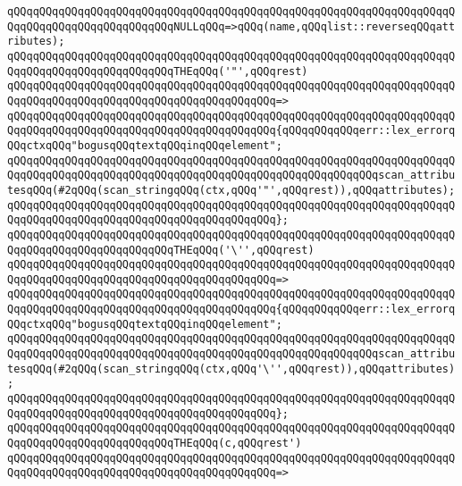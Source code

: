 \verb|qQQqqQQqqQQqqQQqqQQqqQQqqQQqqQQqqQQqqQQqqQQqqQQqqQQqqQQqqQQqqQQqqQQqqQQqqQQqqQQqqQQqqQQqqQQqqQQqNULLqQQq=>qQQq(name,qQQqlist::reverseqQQqattributes);|\newline
\newline
\verb|qQQqqQQqqQQqqQQqqQQqqQQqqQQqqQQqqQQqqQQqqQQqqQQqqQQqqQQqqQQqqQQqqQQqqQQqqQQqqQQqqQQqqQQqqQQqqQQqTHEqQQq('"',qQQqrest)|\newline
\verb|qQQqqQQqqQQqqQQqqQQqqQQqqQQqqQQqqQQqqQQqqQQqqQQqqQQqqQQqqQQqqQQqqQQqqQQqqQQqqQQqqQQqqQQqqQQqqQQqqQQqqQQqqQQqqQQq=>|\newline
\verb|qQQqqQQqqQQqqQQqqQQqqQQqqQQqqQQqqQQqqQQqqQQqqQQqqQQqqQQqqQQqqQQqqQQqqQQqqQQqqQQqqQQqqQQqqQQqqQQqqQQqqQQqqQQqqQQq{qQQqqQQqqQQqerr::lex_errorqQQqctxqQQq"bogusqQQqtextqQQqinqQQqelement";|\newline
\verb|qQQqqQQqqQQqqQQqqQQqqQQqqQQqqQQqqQQqqQQqqQQqqQQqqQQqqQQqqQQqqQQqqQQqqQQqqQQqqQQqqQQqqQQqqQQqqQQqqQQqqQQqqQQqqQQqqQQqqQQqqQQqqQQqscan_attributesqQQq(#2qQQq(scan_stringqQQq(ctx,qQQq'"',qQQqrest)),qQQqattributes);|\newline
\verb|qQQqqQQqqQQqqQQqqQQqqQQqqQQqqQQqqQQqqQQqqQQqqQQqqQQqqQQqqQQqqQQqqQQqqQQqqQQqqQQqqQQqqQQqqQQqqQQqqQQqqQQqqQQqqQQq};|\newline
\newline
\verb|qQQqqQQqqQQqqQQqqQQqqQQqqQQqqQQqqQQqqQQqqQQqqQQqqQQqqQQqqQQqqQQqqQQqqQQqqQQqqQQqqQQqqQQqqQQqqQQqTHEqQQq('\'',qQQqrest)|\newline
\verb|qQQqqQQqqQQqqQQqqQQqqQQqqQQqqQQqqQQqqQQqqQQqqQQqqQQqqQQqqQQqqQQqqQQqqQQqqQQqqQQqqQQqqQQqqQQqqQQqqQQqqQQqqQQqqQQq=>|\newline
\verb|qQQqqQQqqQQqqQQqqQQqqQQqqQQqqQQqqQQqqQQqqQQqqQQqqQQqqQQqqQQqqQQqqQQqqQQqqQQqqQQqqQQqqQQqqQQqqQQqqQQqqQQqqQQqqQQq{qQQqqQQqqQQqerr::lex_errorqQQqctxqQQq"bogusqQQqtextqQQqinqQQqelement";|\newline
\verb|qQQqqQQqqQQqqQQqqQQqqQQqqQQqqQQqqQQqqQQqqQQqqQQqqQQqqQQqqQQqqQQqqQQqqQQqqQQqqQQqqQQqqQQqqQQqqQQqqQQqqQQqqQQqqQQqqQQqqQQqqQQqqQQqscan_attributesqQQq(#2qQQq(scan_stringqQQq(ctx,qQQq'\'',qQQqrest)),qQQqattributes);|\newline
\verb|qQQqqQQqqQQqqQQqqQQqqQQqqQQqqQQqqQQqqQQqqQQqqQQqqQQqqQQqqQQqqQQqqQQqqQQqqQQqqQQqqQQqqQQqqQQqqQQqqQQqqQQqqQQqqQQq};|\newline
\newline
\verb|qQQqqQQqqQQqqQQqqQQqqQQqqQQqqQQqqQQqqQQqqQQqqQQqqQQqqQQqqQQqqQQqqQQqqQQqqQQqqQQqqQQqqQQqqQQqqQQqTHEqQQq(c,qQQqrest')|\newline
\verb|qQQqqQQqqQQqqQQqqQQqqQQqqQQqqQQqqQQqqQQqqQQqqQQqqQQqqQQqqQQqqQQqqQQqqQQqqQQqqQQqqQQqqQQqqQQqqQQqqQQqqQQqqQQqqQQq=>|\newline
